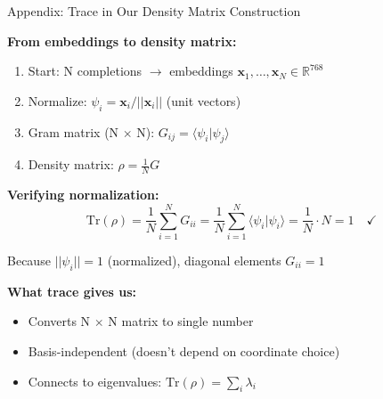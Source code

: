 \documentclass[aspectratio=169,11pt]{beamer}
\begin{document}
\begin{frame}{Appendix: Trace in Our Density Matrix Construction}

\textbf{From embeddings to density matrix:}

\begin{enumerate}
  \item Start: N completions $\to$ embeddings $\mathbf{x}_1, \ldots, \mathbf{x}_N \in \mathbb{R}^{768}$
  \item Normalize: $\psi_i = \mathbf{x}_i / ||\mathbf{x}_i||$ (unit vectors)
  \item Gram matrix (N $\times$ N): $G_{ij} = \langle \psi_i | \psi_j \rangle$
  \item Density matrix: $\rho = \frac{1}{N} G$
\end{enumerate}

\vspace{0.5em}

\textbf{Verifying normalization:}
$$\text{Tr}(\rho) = \frac{1}{N}\sum_{i=1}^{N} G_{ii} = \frac{1}{N}\sum_{i=1}^{N} \langle\psi_i|\psi_i\rangle = \frac{1}{N} \cdot N = 1 \quad \checkmark$$

Because $||\psi_i|| = 1$ (normalized), diagonal elements $G_{ii} = 1$

\vspace{0.5em}

\textbf{What trace gives us:}
\begin{itemize}
  \item Converts N $\times$ N matrix to single number
  \item Basis-independent (doesn't depend on coordinate choice)
  \item Connects to eigenvalues: $\text{Tr}(\rho) = \sum_i \lambda_i$
\end{itemize}

\end{frame}
\end{document}
